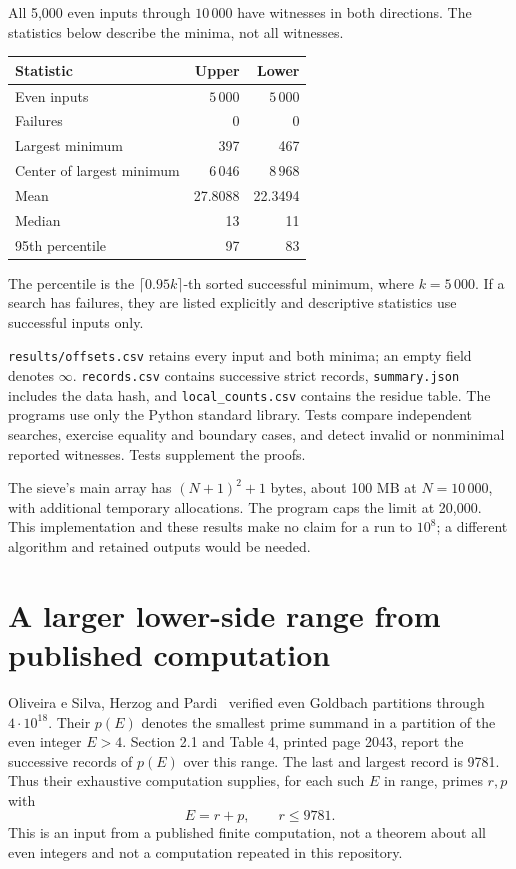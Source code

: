 \documentclass[11pt,a4paper]{article}
\begin{document}
All 5,000 even inputs through $10\,000$ have witnesses in both directions.
The statistics below describe the minima, not all witnesses.
\begin{center}
\begin{tabular}{lrr}
\toprule
Statistic & Upper & Lower\\
\midrule
Even inputs & $5\,000$ & $5\,000$\\
Failures & 0 & 0\\
Largest minimum & 397 & 467\\
Center of largest minimum & $6\,046$ & $8\,968$\\
Mean & 27.8088 & 22.3494\\
Median & 13 & 11\\
95th percentile & 97 & 83\\
\bottomrule
\end{tabular}
\end{center}
The percentile is the $\lceil0.95k\rceil$-th sorted successful minimum,
where $k=5\,000$. If a search has failures, they are listed explicitly and
descriptive statistics use successful inputs only.

\texttt{results/offsets.csv} retains every input and both minima;
an empty field denotes $\infty$. \texttt{records.csv} contains successive
strict records, \texttt{summary.json} includes the data hash, and
\texttt{local\_counts.csv} contains the residue table. The programs use
only the Python standard library. Tests compare independent searches,
exercise equality and boundary cases, and detect invalid or nonminimal
reported witnesses. Tests supplement the proofs.

The sieve's main array has $(N+1)^2+1$ bytes, about 100 MB at $N=10\,000$,
with additional temporary allocations. The program caps the limit at
20,000. This implementation and these results make no claim for a run to
$10^8$; a different algorithm and retained outputs would be needed.

\newpage
\section{A larger lower-side range from published computation}
Oliveira e Silva, Herzog and Pardi~\cite{goldbach} verified even Goldbach
partitions through $4\cdot10^{18}$. Their $p(E)$ denotes the smallest prime
summand in a partition of the even integer $E>4$.
Section 2.1 and Table 4, printed page 2043, report the successive records of
$p(E)$ over this range. The last and largest record is 9781.
Thus their exhaustive computation supplies, for each such $E$ in range,
primes $r,p$ with
\[
 E=r+p,\qquad r\le9781.
\]
This is an input from a published finite computation, not a theorem
about all even integers and not a computation repeated in this repository.
\end{document}
